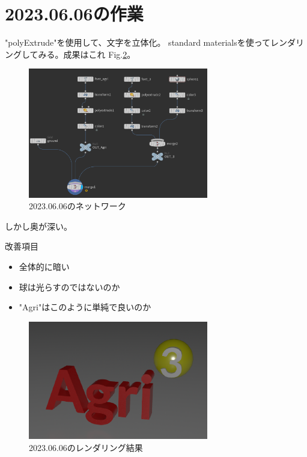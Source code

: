 \documentclass[uplatex,dvipdfmx]{jsarticle}
\begin{document}
\section{2023.06.06の作業}
"polyExtrude"を使用して、文字を立体化。
standard materialsを使ってレンダリングしてみる。成果はこれ Fig.\ref{fig:rendered_230606}。


\begin{figure}[h]
  \centering
  \includegraphics[width=0.7\textwidth]{figs/network_230606.PNG}
  \caption{2023.06.06のネットワーク}
  \label{fig:network_230606}
\end{figure}

しかし奥が深い。

\bigskip
改善項目
\begin{itemize}
  \item 全体的に暗い
  \item 球は光らすのではないのか
  \item "Agri"はこのように単純で良いのか
\end{itemize}



\begin{figure}[h]
  \centering
  \includegraphics[width=0.7\textwidth]{figs/logo_230606.PNG}
  \caption{2023.06.06のレンダリング結果}
  \label{fig:rendered_230606}
\end{figure}


\printbibliography
\end{document}
